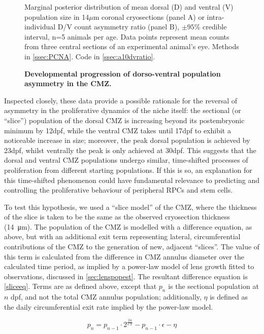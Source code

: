 \begin{figure}[!h]
    \caption{{\bf Developmental progression of dorso-ventral population asymmetry in the CMZ.}}
    Marginal posterior distribution of mean dorsal (D) and ventral (V) population size in 14$\mu$m coronal cryosections (panel A) or intra-individual D/V count asymmetry ratio (panel B), $\pm 95\%$ credible interval, n=5 animals per age. Data points represent mean counts from three central sections of an experimental animal's eye. 
    \label{DVontology}
    Methods in \autoref{ssec:PCNA}.
    Code in \autoref{ssec:a10dvratio}. 
\end{figure}

Inspected closely, these data provide a possible rationale for the reversal of asymmetry in the proliferative dynamics of the niche itself: the sectional (or ``slice'') population of the dorsal CMZ is increasing beyond its postembryonic minimum by 12dpf, while the ventral CMZ takes until 17dpf to exhibit a noticeable increase in size; moreover, the peak dorsal population is achieved by 23dpf, whilst ventrally the peak is only achieved at 30dpf. This suggests that the dorsal and ventral CMZ populations undergo similar, time-shifted processes of proliferation from different starting populations. If this is so, an explanation for this time-shifted phenomenon could have fundamental relevance to predicting and controlling the proliferative behaviour of peripheral RPCs and stem cells.

To test this hypothesis, we used a ``slice model'' of the CMZ, where the thickness of the slice is taken to be the same as the observed cryosection thickness (\SI{14}{\micro\metre}). The population of the CMZ is modelled with a difference equation, as above, but with an additional exit term representing lateral, circumferential contributions of the CMZ to the generation of new, adjacent ``slices''. The value of this term is calculated from the difference in CMZ annulus diameter over the calculated time period, as implied by a power-law model of lens growth fitted to observations, discussed in \autoref{sec:lenspopest}. The resultant difference equation is \autoref{sliceeq}. Terms are as defined above, except that $p_n$ is the sectional population at $n$ dpf, and not the total CMZ annulus population; additionally, $\eta$ is defined as the daily circumferential exit rate implied by the power-law model.

\begin{equation}
    p_n=p_{n-1} \cdot 2^{\frac{24}{CT}} - p_{n-1} \cdot \epsilon - \eta
    \label{sliceeq}
\end{equation}

